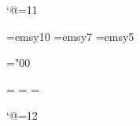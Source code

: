 %
%
\catcode`@=11

\def\hexnumber@#1{\ifnum#1<10 \number#1\else
 \ifnum#1=10 A\else\ifnum#1=11 B\else\ifnum#1=12 C\else
 \ifnum#1=13 D\else\ifnum#1=14 E\else\ifnum#1=15 F\fi\fi\fi\fi\fi\fi\fi}

\newfam\emsy

\edef\emsy@{\hexnumber@\emsy}

\font\tenemsy=emsy10
\font\sevenemsy=emsy7
\font\fiveemsy=emsy5

\skewchar\tenemsy="00

\textfont\emsy=\tenemsy
\scriptfont\emsy=\sevenemsy
\scriptscriptfont\emsy=\fiveemsy

\def\cev{\mathaccent"0\emsy@00 }       %
\def\fatuparrow{\mathhexbox\emsy@10}   %
\def\fatdownarrow{\mathhexbox\emsy@11} %
\def\lefttriangle{\mathhexbox\emsy@12} %
\def\padlock{\mathhexbox\emsy@13}      %

\catcode`@=12 %
